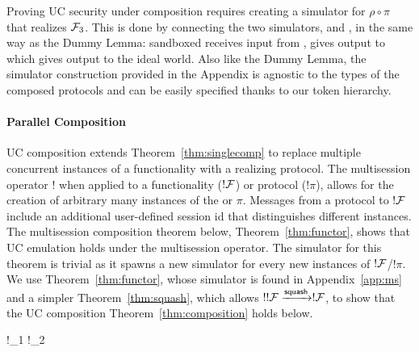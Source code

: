 Proving UC security under composition requires creating a simulator for $\rho \circ \pi$ that realizes $\mathcal{F}_3$. 
This is done by connecting the two simulators, \SIM{\pi} and \SIM{\rho}, in the same way as the Dummy Lemma: sandboxed \SIM{\pi} receives input from \Z, gives output to \SIM{\rho} which gives output to the ideal world.  
Also like the Dummy Lemma, the simulator construction provided in the Appendix is agnostic to the types of the composed protocols and can be easily specified thanks to our token hierarchy. 

\paragraph*{\textbf{Parallel Composition}}
UC composition extends Theorem~\ref{thm:singlecomp} to replace multiple concurrent instances of a functionality with a realizing protocol. 
The multisession operator $!$ when applied to a functionality ($!\mathcal{F}$) or protocol ($!\pi$), allows for the creation of arbitrary many instances of the \F or $\pi$.
Messages from a protocol to $!\mathcal{F}$ include an additional user-defined session id that distinguishes different instances. 
The multisession composition theorem below, Theorem~\ref{thm:functor}, shows that UC emulation holds under the multisession operator. 
The simulator for this theorem is trivial as it spawns a new simulator for every new instances of $!\mathcal{F}$/$!\pi$.
We use Theorem~\ref{thm:functor}, whose simulator is found in Appendix~\ref{app:ms} and a simpler Theorem~\ref{thm:squash}, which allows $!!\mathcal{F} \xrightarrow{{\mathsf {squash}}} !\mathcal{F}$, 
to show that the UC composition Theorem~\ref{thm:composition} holds below.

\begin{theorem}\label{thm:functor}
\vspace{-0.5em}
	\begin{mathpar}
		{
			!\F_1 \xrightarrow{!\pi} !\F_2
		}
	\end{mathpar}
\end{theorem}


